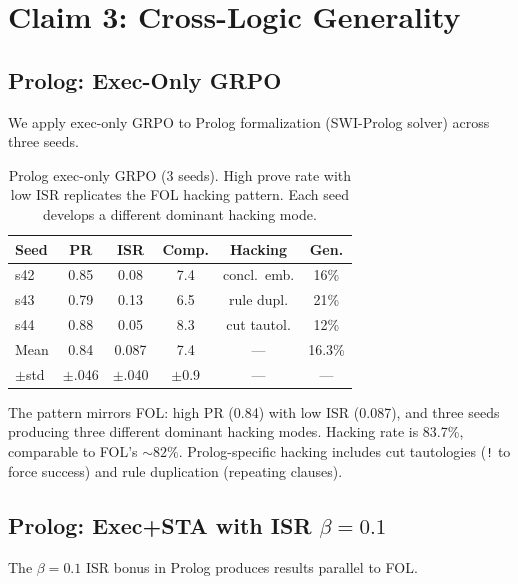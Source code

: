 \documentclass[11pt,twocolumn]{article}
\newcommand{\isr}{\textsc{ISR}}
\newcommand{\pr}{\textsc{PR}}
\newcommand{\grpo}{\textsc{GRPO}}
\begin{document}
\section{Claim 3: Cross-Logic Generality}
\label{sec:claim3}

\subsection{Prolog: Exec-Only \grpo{}}

We apply exec-only \grpo{} to Prolog formalization (SWI-Prolog solver) across three seeds.

\begin{table}[h]
\centering
\caption{Prolog exec-only \grpo{} (3 seeds). High prove rate with low ISR replicates the FOL hacking pattern. Each seed develops a different dominant hacking mode.}
\label{tab:prolog_exec}
\small
\begin{tabular}{@{}lccccc@{}}
\toprule
Seed & \pr{} & \isr{} & Comp. & Hacking & Gen. \\
\midrule
s42 & 0.85 & 0.08 & 7.4 & concl.\ emb. & 16\% \\
s43 & 0.79 & 0.13 & 6.5 & rule dupl. & 21\% \\
s44 & 0.88 & 0.05 & 8.3 & cut tautol. & 12\% \\
\midrule
Mean & 0.84 & 0.087 & 7.4 & --- & 16.3\% \\
$\pm$std & $\pm$.046 & $\pm$.040 & $\pm$0.9 & --- & --- \\
\bottomrule
\end{tabular}
\end{table}

The pattern mirrors FOL: high \pr{} (0.84) with low \isr{} (0.087), and three seeds producing three different dominant hacking modes.
Hacking rate is 83.7\%, comparable to FOL's ${\sim}82\%$.
Prolog-specific hacking includes cut tautologies (\texttt{!} to force success) and rule duplication (repeating clauses).

\subsection{Prolog: Exec+STA with ISR $\beta{=}0.1$}

The $\beta{=}0.1$ ISR bonus in Prolog produces results parallel to FOL.
\end{document}

